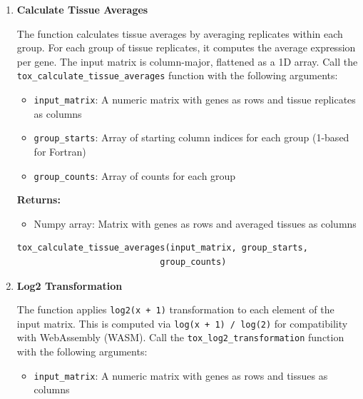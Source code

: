 \documentclass[11pt]{article}
\begin{document}
\begin{enumerate}
\begin{enumerate}
	      	\item \textbf{Calculate Tissue Averages}
	      	      
	      	      The function calculates tissue averages by averaging replicates within
	      	      each group. For each group of tissue replicates, it computes the average
	      	      expression per gene. The input matrix is column-major, flattened as a 1D
	      	      array. Call the \texttt{tox\_calculate\_tissue\_averages} function with
	      	      the following arguments:
	      	      
	      	      \begin{itemize}
	      	      	\item \texttt{input\_matrix}: A numeric matrix with genes as rows and
	      	      	      tissue replicates as columns
	      	      	      
	      	      	\item \texttt{group\_starts}: Array of starting column indices for each
	      	      	      group (1-based for Fortran)
	      	      	      
	      	      	\item \texttt{group\_counts}: Array of counts for each group
	      	      \end{itemize}
	      	      
	      	      \textbf{Returns:}
	      	      \begin{itemize}
	      	      	\item Numpy array: Matrix with genes as rows and averaged tissues as
	      	      	      columns
	      	      \end{itemize}
	      	      \begin{lstlisting}[language=Python, caption={Python Tissue Averages Calculation}]
tox_calculate_tissue_averages(input_matrix, group_starts, 
                            group_counts)
	      	      \end{lstlisting}
	      	      
	      	\item \textbf{Log2 Transformation}
	      	      
	      	      The function applies \texttt{log2(x + 1)} transformation to each
	      	      element of the input matrix. This is computed via \texttt{log(x + 1) /
	      	      	log(2)} for compatibility with WebAssembly (WASM). Call the \texttt{tox\_log2\_transformation}
	      	      function with the following arguments:
	      	      
	      	      \begin{itemize}
	      	      	\item \texttt{input\_matrix}: A numeric matrix with genes as rows and
	      	      	      tissues as columns
	      	      \end{itemize}
	      	      

\end{enumerate}
\end{enumerate}
\end{document}

